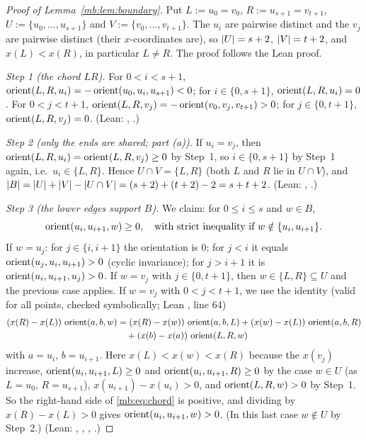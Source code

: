 \begin{proof}[Proof of Lemma~\ref{mb:lem:boundary}]
Put $L:=u_0=v_0$, $R:=u_{s+1}=v_{t+1}$, $U:=\{u_0,\dots,u_{s+1}\}$ and $V:=\{v_0,\dots,v_{t+1}\}$. The $u_i$ are pairwise
distinct and the $v_j$ are pairwise distinct (their $x$-coordinates are), so $\lvert U\rvert=s+2$, $\lvert V\rvert=t+2$, and
$x(L)<x(R)$, in particular $L\ne R$. The proof follows the Lean proof.

\emph{Step 1 (the chord $LR$).} For $0<i<s+1$, $\operatorname{orient}(L,R,u_i)=-\operatorname{orient}(u_0,u_i,u_{s+1})<0$; for $i\in\{0,s+1\}$,
$\operatorname{orient}(L,R,u_i)=0$. For $0<j<t+1$, $\operatorname{orient}(L,R,v_j)=-\operatorname{orient}(v_0,v_j,v_{t+1})>0$; for $j\in\{0,t+1\}$,
$\operatorname{orient}(L,R,v_j)=0$. (Lean: , .)

\emph{Step 2 (only the ends are shared; part (a)).} If $u_i=v_j$, then $\operatorname{orient}(L,R,u_i)=\operatorname{orient}(L,R,v_j)\ge0$ by
Step~1, so $i\in\{0,s+1\}$ by Step~1 again, i.e.\ $u_i\in\{L,R\}$. Hence $U\cap V=\{L,R\}$ (both $L$ and $R$ lie in
$U\cap V$), and $\lvert B\rvert=\lvert U\rvert+\lvert V\rvert-\lvert U\cap V\rvert=(s+2)+(t+2)-2=s+t+2$. (Lean: ,
.)

\emph{Step 3 (the lower edges support $B$).} We claim: for $0\le i\le s$ and $w\in B$,
\begin{equation}\label{mb:eq:edge}
\operatorname{orient}(u_i,u_{i+1},w)\ge0,\quad\text{with strict inequality if } w\notin\{u_i,u_{i+1}\}.
\end{equation}
If $w=u_j$: for $j\in\{i,i+1\}$ the orientation is $0$; for $j<i$ it equals $\operatorname{orient}(u_j,u_i,u_{i+1})>0$ (cyclic
invariance); for $j>i+1$ it is $\operatorname{orient}(u_i,u_{i+1},u_j)>0$. If $w=v_j$ with $j\in\{0,t+1\}$, then $w\in\{L,R\}\subseteq
U$ and the previous case applies. If $w=v_j$ with $0<j<t+1$, we use the identity (valid for all points, checked
symbolically; Lean , line 64)
\begin{equation}\label{mb:eq:chord}
\begin{split}
(x(R)-x(L))\,\operatorname{orient}(a,b,w)&=(x(R)-x(w))\,\operatorname{orient}(a,b,L)+(x(w)-x(L))\,\operatorname{orient}(a,b,R)\\
&\quad+(x(b)-x(a))\,\operatorname{orient}(L,R,w)
\end{split}
\end{equation}
with $a=u_i$, $b=u_{i+1}$. Here $x(L)<x(w)<x(R)$ because the $x(v_j)$ increase, $\operatorname{orient}(u_i,u_{i+1},L)\ge0$ and
$\operatorname{orient}(u_i,u_{i+1},R)\ge0$ by the case $w\in U$ (as $L=u_0$, $R=u_{s+1}$), $x(u_{i+1})-x(u_i)>0$, and
$\operatorname{orient}(L,R,w)>0$ by Step~1. So the right-hand side of \eqref{mb:eq:chord} is positive, and dividing by $x(R)-x(L)>0$
gives $\operatorname{orient}(u_i,u_{i+1},w)>0$. (In this last case $w\notin U$ by Step~2.) (Lean: ,
, , .)


\end{proof}
